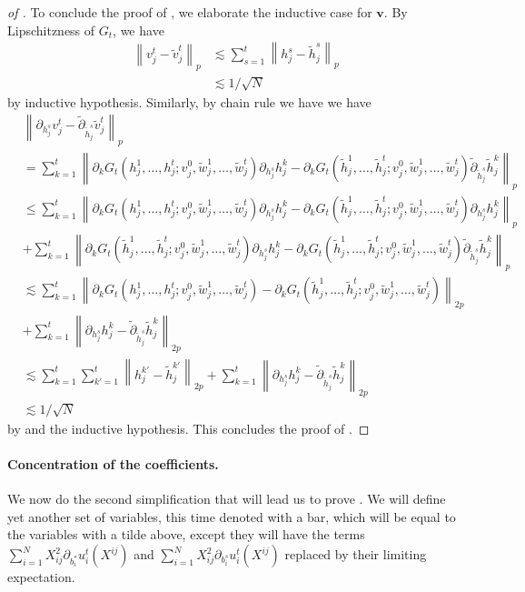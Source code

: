 \documentclass{article}
\newcommand{\1}{\mathbbm{1}}
\newcommand{\norm}[1]{\left\lVert#1\right\rVert}
\theoremstyle{plain}
\theoremstyle{definition}
\theoremstyle{remark}
\newcommand{\bfv}{\boldsymbol{v}}
\begin{document}
\begin{proof}[of ]
To conclude the proof of , we elaborate the inductive case for $\bfv.$ By Lipschitzness of $G_t$, we have 
\begin{align*}
    \norm{v_j^t - \tilde{v}_j^t}_p &\lesssim \sum_{s=1}^{t}\norm{h_j^s - \tilde{h}_j^s}_p \\
    &\lesssim 1/\sqrt{N}
\end{align*}
by inductive hypothesis. Similarly, by chain rule we have we have 
\begin{align*}
&\norm{\partial_{h_j^s} v_j^t - \tilde{\partial}_{\tilde{h}_j^s} \tilde{v}_j^t}_p \\
&= \sum_{k=1}^t \norm{\partial_k G_t(h_j^1, \dots, h_j^t; v_j^0,\tilde{w}_j^1,\dots, \tilde{w}_j^t) \partial_{h_j^s} h_j^k - \partial_k G_t(\tilde{h}_j^1, \dots, \tilde{h}_j^t; v_j^0,\tilde{w}_j^1,\dots, \tilde{w}_j^t) \tilde{\partial}_{\tilde{h}_j^s} \tilde{h}_j^k  }_p \\
&\leq \sum_{k=1}^t \norm{\partial_k G_t(h_j^1, \dots, h_j^t; v_j^0,\tilde{w}_j^1,\dots, \tilde{w}_j^t) \partial_{h_j^s} h_j^k - \partial_k G_t(\tilde{h}_j^1, \dots, \tilde{h}_j^t; v_j^0,\tilde{w}_j^1,\dots, \tilde{w}_j^t) \partial_{h_j^s} h_j^k}_p \\
&+ \sum_{k=1}^t \norm{\partial_k G_t(\tilde{h}_j^1, \dots, \tilde{h}_j^t; v_j^0,\tilde{w}_j^1,\dots, \tilde{w}_j^t) \partial_{h_j^s} h_j^k- \partial_k G_t(\tilde{h}_j^1, \dots, \tilde{h}_j^t; v_j^0,\tilde{w}_j^1,\dots, \tilde{w}_j^t) \tilde{\partial}_{\tilde{h}_j^s} \tilde{h}_j^k  }_p  \\
&\lesssim \sum_{k=1}^t \norm{\partial_k G_t(h_j^1, \dots, h_j^t; v_j^0,\tilde{w}_j^1,\dots, \tilde{w}_j^t) - \partial_k G_t(\tilde{h}_j^1, \dots, \tilde{h}_j^t; v_j^0,\tilde{w}_j^1,\dots, \tilde{w}_j^t) }_{2p}\\
&+ \sum_{k=1}^t \norm{ \partial_{h_j^s} h_j^k-  \tilde{\partial}_{\tilde{h}_j^s} \tilde{h}_j^k  }_{2p} \\
&\lesssim \sum_{k=1}^t\sum_{k'=1}^t \norm{h_j^{k'} - \tilde{h}_j^{k'}}_{2p} + \sum_{k=1}^t \norm{ \partial_{h_j^s} h_j^k-  \tilde{\partial}_{\tilde{h}_j^s} \tilde{h}_j^k  }_{2p} \\ 
&\lesssim 1/\sqrt{N}
\end{align*} 
by  and the inductive hypothesis. This concludes the proof of .
\end{proof}

\paragraph{Concentration of the coefficients.} We now do the second simplification that will lead us to prove . We will define yet another set of variables, this time denoted with a bar, which will be equal to the variables with a tilde above, except they will have the terms $\sum_{i=1}^N X_{ij}^2\partial_{b_i^*}u_i^{t}  (X^{ij})$ and $\sum_{i=1}^N X_{ij}^2\partial_{b_i^s}u_i^{t}  (X^{ij})$ replaced by their limiting expectation. 
\end{document}
